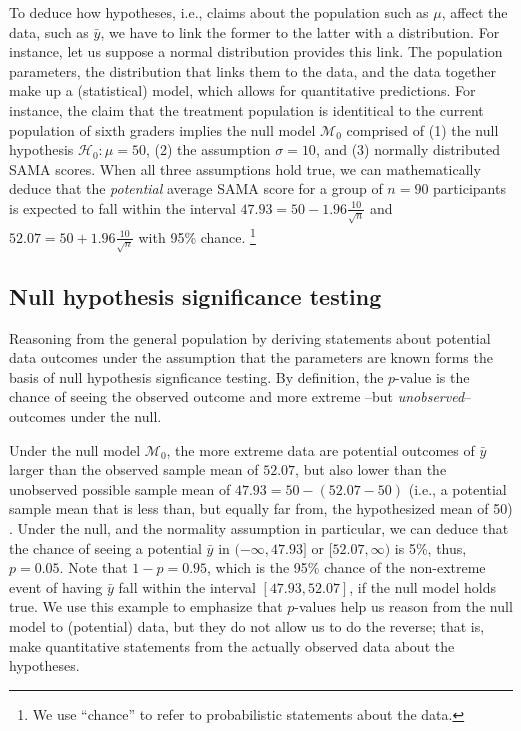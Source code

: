 \documentclass[english,,doc,floatsintext]{apa6}
\begin{document}
To deduce how hypotheses, i.e., claims about the population such as \(\mu\), affect the data, such as \(\bar{y}\), we have to link the former to the latter with a distribution. For instance, let us suppose a normal distribution provides this link. The population parameters, the distribution that links them to the data, and the data together make up a (statistical) model, which allows for quantitative predictions. For instance, the claim that the treatment population is identitical to the current population of sixth graders implies the null model \(\mathcal{M}_{0}\) comprised of (1) the null hypothesis \(\mathcal{H}_{0}: \mu = 50\), (2) the assumption \(\sigma = 10\), and (3) normally distributed SAMA scores. When all three assumptions hold true, we can mathematically deduce that the \emph{potential} average SAMA score for a group of \(n = 90\) participants is expected to fall within the interval \(47.93 = 50 - 1.96 \frac{10}{\sqrt{n}}\) and \(52.07 = 50 + 1.96 \frac{10}{\sqrt{n}}\) with 95\% chance.
\footnote{We use ``chance'' to refer to probabilistic statements about the data.}

\hypertarget{null-hypothesis-significance-testing}{%
\subsection{Null hypothesis significance testing}\label{null-hypothesis-significance-testing}}

Reasoning from the general population by deriving statements about potential data outcomes under the assumption that the parameters are known forms the basis of null hypothesis signficance testing. By definition, the \(p\)-value is the chance of seeing the observed outcome and more extreme --but \emph{unobserved}-- outcomes under the null.

Under the null model \(\mathcal{M}_{0}\), the more extreme data are potential outcomes of \(\bar{y}\) larger than the observed sample mean of \(52.07\), but also lower than the unobserved possible sample mean of \(47.93 = 50 - (52.07-50)\) (i.e., a potential sample mean that is less than, but equally far from, the hypothesized mean of 50) . Under the null, and the normality assumption in particular, we can deduce that the chance of seeing a potential \(\bar{y}\) in \((- \infty, 47.93]\) or \([52.07, \infty)\) is 5\%, thus, \(p=0.05\). Note that \(1 - p = 0.95\), which is the 95\% chance of the non-extreme event of having \(\bar{y}\) fall within the interval \([47.93, 52.07]\), if the null model holds true. We use this example to emphasize that \(p\)-values help us reason from the null model to (potential) data, but they do not allow us to do the reverse; that is, make quantitative statements from the actually observed data about the hypotheses.
\end{document}
